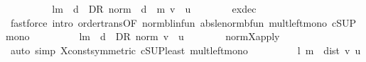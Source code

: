 \begin{isabellebody}
\ \ \ \ \isamarkupfalse%
\ \isamarkupfalse%
\ {\isachardoublequoteopen}{\isasymdots}\ {\isasymle}\ l{\isacharcircum}{\kern0pt}m\ {\isacharasterisk}{\kern0pt}\ {\isacharparenleft}{\kern0pt}{\isasymSqunion}d\ {\isasymin}\ D\isactrlsub R{\isachardot}{\kern0pt}\ norm\ {\isacharparenleft}{\kern0pt}{\isacharparenleft}{\kern0pt}{\isasymP}\ d\ {\isacharcircum}{\kern0pt}{\isacharcircum}{\kern0pt}\ m{\isacharparenright}{\kern0pt}\ {\isacharparenleft}{\kern0pt}{\isacharparenleft}{\kern0pt}v\ {\isacharminus}{\kern0pt}\ u{\isacharparenright}{\kern0pt}{\isacharparenright}{\kern0pt}{\isacharparenright}{\kern0pt}{\isacharparenright}{\kern0pt}{\isachardoublequoteclose}\isanewline
\ \ \ \ \ \ \isamarkupfalse%
\ ex{\isacharunderscore}{\kern0pt}dec\isanewline
\ \ \ \ \ \ \isamarkupfalse%
\ {\isacharparenleft}{\kern0pt}fastforce\ intro{\isacharbang}{\kern0pt}{\isacharcolon}{\kern0pt}\ order{\isachardot}{\kern0pt}trans{\isacharbrackleft}{\kern0pt}OF\ norm{\isacharunderscore}{\kern0pt}blinfun{\isacharbrackright}{\kern0pt}\ abs{\isacharunderscore}{\kern0pt}le{\isacharunderscore}{\kern0pt}norm{\isacharunderscore}{\kern0pt}bfun\ mult{\isacharunderscore}{\kern0pt}left{\isacharunderscore}{\kern0pt}mono\ cSUP{\isacharunderscore}{\kern0pt}mono{\isacharparenright}{\kern0pt}\isanewline
\ \ \ \ \isamarkupfalse%
\ \isamarkupfalse%
\ {\isachardoublequoteopen}{\isasymdots}\ {\isasymle}\ l{\isacharcircum}{\kern0pt}m\ {\isacharasterisk}{\kern0pt}\ {\isacharparenleft}{\kern0pt}{\isasymSqunion}d\ {\isasymin}\ D\isactrlsub R{\isachardot}{\kern0pt}\ norm\ {\isacharparenleft}{\kern0pt}{\isacharparenleft}{\kern0pt}v\ {\isacharminus}{\kern0pt}\ u{\isacharparenright}{\kern0pt}{\isacharparenright}{\kern0pt}{\isacharparenright}{\kern0pt}{\isachardoublequoteclose}\isanewline
\ \ \ \ \ \ \isamarkupfalse%
\ norm{\isacharunderscore}{\kern0pt}{\isasymP}\isactrlsub X{\isacharunderscore}{\kern0pt}apply\isanewline
\ \ \ \ \ \ \isamarkupfalse%
\ {\isacharparenleft}{\kern0pt}auto\ simp{\isacharcolon}{\kern0pt}\ {\isasymP}\isactrlsub X{\isacharunderscore}{\kern0pt}const{\isacharbrackleft}{\kern0pt}symmetric{\isacharbrackright}{\kern0pt}\ cSUP{\isacharunderscore}{\kern0pt}least\ mult{\isacharunderscore}{\kern0pt}left{\isacharunderscore}{\kern0pt}mono{\isacharparenright}{\kern0pt}\isanewline
\ \ \ \ \isamarkupfalse%
\ \isamarkupfalse%
\ {\isachardoublequoteopen}{\isasymdots}\ {\isacharequal}{\kern0pt}\ l\ {\isacharcircum}{\kern0pt}m\ {\isacharasterisk}{\kern0pt}\ dist\ v\ u{\isachardoublequoteclose}\isanewline

\end{isabellebody}
